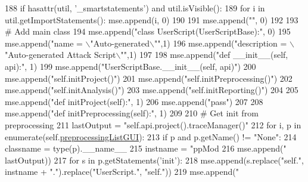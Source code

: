 \begin{DoxyCode}
{188             \textcolor{keywordflow}{if} hasattr(util, \textcolor{stringliteral}{'\_smartstatements'}) \textcolor{keywordflow}{and} util.isVisible():
189                 \textcolor{keywordflow}{for} i \textcolor{keywordflow}{in} util.getImportStatements(): mse.append(i, 0)
190 
191         mse.append(\textcolor{stringliteral}{""}, 0)
192 
193         \textcolor{comment}{# Add main class}
194         mse.append(\textcolor{stringliteral}{"class UserScript(UserScriptBase):"}, 0)
195         mse.append(\textcolor{stringliteral}{"name = \(\backslash\)"Auto-generated\(\backslash\)""},1)
196         mse.append(\textcolor{stringliteral}{"description = \(\backslash\)"Auto-generated Attack Script\(\backslash\)""},1)
197 
198         mse.append(\textcolor{stringliteral}{"def \_\_init\_\_(self, api):"}, 1)
199         mse.append(\textcolor{stringliteral}{"UserScriptBase.\_\_init\_\_(self, api)"})
200         mse.append(\textcolor{stringliteral}{"self.initProject()"})
201         mse.append(\textcolor{stringliteral}{"self.initPreprocessing()"})
202         mse.append(\textcolor{stringliteral}{"self.initAnalysis()"})
203         mse.append(\textcolor{stringliteral}{"self.initReporting()"})
204 
205         mse.append(\textcolor{stringliteral}{"def initProject(self):"}, 1)
206         mse.append(\textcolor{stringliteral}{"pass"})
207 
208         mse.append(\textcolor{stringliteral}{"def initPreprocessing(self):"}, 1)
209 
210         \textcolor{comment}{# Get init from preprocessing}
211         lastOutput = \textcolor{stringliteral}{"self.api.project().traceManager()"}
212         \textcolor{keywordflow}{for} i, p \textcolor{keywordflow}{in} enumerate(self.\hyperlink{classsoftware_1_1chipwhisperer_1_1analyzer_1_1utils_1_1attackscriptgen_1_1AttackScriptGen_a2a42def4f16bc00d2233121aa2c3ba1f}{preprocessingListGUI}):
213             \textcolor{keywordflow}{if} p \textcolor{keywordflow}{and} p.getName() != \textcolor{stringliteral}{"None"}:
214                 classname = type(p).\_\_name\_\_
215                 instname = \textcolor{stringliteral}{"ppMod%
216                 mse.append(\textcolor{stringliteral}{"%
      lastOutput))
217                 \textcolor{keywordflow}{for} s \textcolor{keywordflow}{in} p.getStatements(\textcolor{stringliteral}{'init'}):
218                     mse.append(s.replace(\textcolor{stringliteral}{"self."}, instname + \textcolor{stringliteral}{"."}).replace(\textcolor{stringliteral}{"UserScript."}, \textcolor{stringliteral}{"self."}))
219                 mse.append(\textcolor{stringliteral}{"%
}}}}
\end{DoxyCode}
